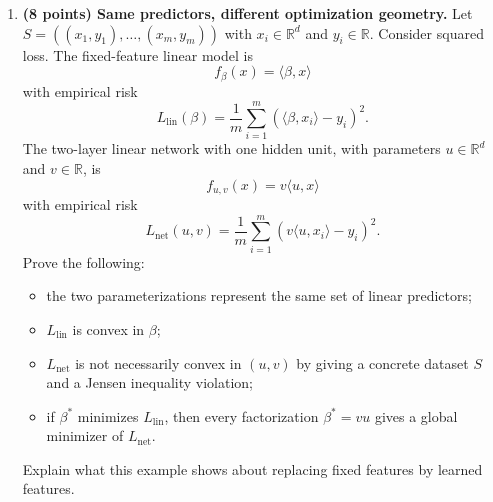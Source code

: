 \documentclass[11pt]{article}
\begin{document}
\begin{enumerate}
\begin{solutionbox}
    \medskip

    \textbf{Connection to the Week~5 message.}

    This result shows the main limitation of fixed-feature convex learning. Once a useful feature
    map is fixed, learning a linear predictor over those features can be statistically clean and
    computationally efficient. For example, many convex losses can be optimized efficiently in the
    feature space.

    However, the hard part may be hidden in the feature map itself. To represent all parity
    functions exactly with a fixed feature map, the feature dimension must be
    \[
    2^d,
    \]
    which is exponential in the original input dimension. Therefore the fixed-feature approach can
    move the difficulty from optimization into representation.

    Neural networks try to avoid hand-designing an exponentially large fixed feature map by learning
    features from data. But once the features are learned rather than fixed, the optimization problem
    is generally no longer convex. This connects directly to Part~B.4.

    \end{solutionbox}

    \item \textbf{(8 points) Same predictors, different optimization geometry.}
    Let $S = ((x_1, y_1), \ldots, (x_m, y_m))$ with $x_i \in \mathbb{R}^d$ and $y_i \in \mathbb{R}$. 
    Consider squared loss.
    The fixed-feature linear model is 
    \[
    f_\beta(x) = \langle \beta, x \rangle
    \]
    with empirical risk
    \[
    L_{\mathrm{lin}}(\beta) 
    = \frac{1}{m} \sum_{i=1}^m \left( \langle \beta, x_i \rangle - y_i \right)^2.
    \]
    The two-layer linear network with one hidden unit, with parameters $u \in \mathbb{R}^d$ 
    and $v \in \mathbb{R}$, is
    \[
    f_{u,v}(x) = v \langle u, x \rangle
    \]
    with empirical risk
    \[
    L_{\mathrm{net}}(u,v) 
    = \frac{1}{m} \sum_{i=1}^m \left( v \langle u, x_i \rangle - y_i \right)^2.
    \]
    Prove the following:
    \begin{itemize}
        \item the two parameterizations represent the same set of linear predictors;
        \item $L_{\mathrm{lin}}$ is convex in $\beta$;
        \item $L_{\mathrm{net}}$ is not necessarily convex in $(u,v)$ by giving a concrete dataset $S$ 
        and a Jensen inequality violation;
        \item if $\beta^\ast$ minimizes $L_{\mathrm{lin}}$, then every factorization 
        $\beta^\ast = v u$ gives a global minimizer of $L_{\mathrm{net}}$.
    \end{itemize}
    Explain what this example shows about replacing fixed features by learned features.


\end{enumerate}
\end{document}
